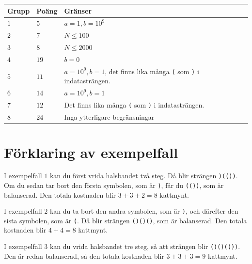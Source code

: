 
\noindent
\begin{tabular}{| l | l | p{12cm} |}
  \hline
  \textbf{Grupp} & \textbf{Poäng} & \textbf{Gränser} \\ \hline
  $1$    & $5$        & $a = 1, b = 10^9$ \\ \hline
  $2$    & $7$        & $N \le 100$  \\ \hline
  $3$    & $8$        & $N \le 2000$ \\ \hline
  $4$    & $19$       & $b = 0$ \\ \hline
  $5$    & $11$       & $a = 10^9, b = 1$, det finns lika många \texttt{(} som \texttt{)} i indatasträngen. \\ \hline
  $6$    & $14$       & $a = 10^9, b = 1$ \\ \hline
  $7$    & $12$       & Det finns lika många \texttt{(} som \texttt{)} i indatasträngen. \\ \hline
  $8$    & $24$       & Inga ytterligare begränsningar \\ \hline
\end{tabular}

\section*{Förklaring av exempelfall}
I exempelfall $1$ kan du först vrida halsbandet två steg.
Då blir strängen \texttt{)(())}.
Om du sedan tar bort den första symbolen, som är \texttt{)}, får du \texttt{(())}, som är balanserad.
Den totala kostnaden blir $3 + 3 + 2 = 8$ kattmynt.

I exempelfall $2$ kan du ta bort den andra symbolen, som är \texttt{)}, och därefter den sista symbolen, som är \texttt{(}.
Då blir strängen \texttt{()()()}, som är balanserad.
Den totala kostnaden blir $4 + 4 = 8$ kattmynt.

I exempelfall $3$ kan du vrida halsbandet tre steg, så att strängen blir \texttt{()()(())}.
Den är redan balanserad, så den totala kostnaden blir $3 + 3 + 3 = 9$ kattmynt.
